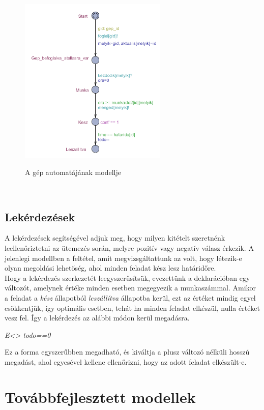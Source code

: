 \documentclass {report}
\begin{document}
    \begin{figure}[htpb]
        \begin{center}
       \includegraphics[height=8cm]{Feladat}\\
        \caption{A gép automatájának modellje}
        \end{center}
        \end{figure}
    \\    
   
    \subsection{Lekérdezések}
    A lekérdezések segítségével adjuk meg, hogy milyen kitételt szeretnénk leellenőriztetni az ütemezés során, melyre pozitív vagy negatív válasz érkezik. A jelenlegi modellben a feltétel, amit megvizsgáltattunk az volt, hogy létezik-e olyan megoldási lehetőség, ahol minden feladat kész lesz határidőre.\\
    Hogy a lekérdezés szerkezetét leegyszerűsítsük, evezettünk a deklarációban egy változót, amelynek értéke minden esetben megegyezik a munkaszámmal. Amikor a feladat a \emph{kész} állapotból \emph{leszállítva} állapotba kerül, ezt az értéket mindig egyel csökkentjük, így optimális esetben, tehát ha minden feladat elkészül, nulla értéket vesz fel. Így a lekérdezés az alábbi módon kerül megadásra.
    \begin{center}
	\emph{E<> todo==0}
    \end{center}
    Ez a forma egyszerűbben megadható, és kiváltja a plusz változó nélküli hosszú megadást, ahol egyesével kellene ellenőrizni, hogy az adott feladat elkészült-e.
    
\section{Továbbfejlesztett modellek}
\end{document}
